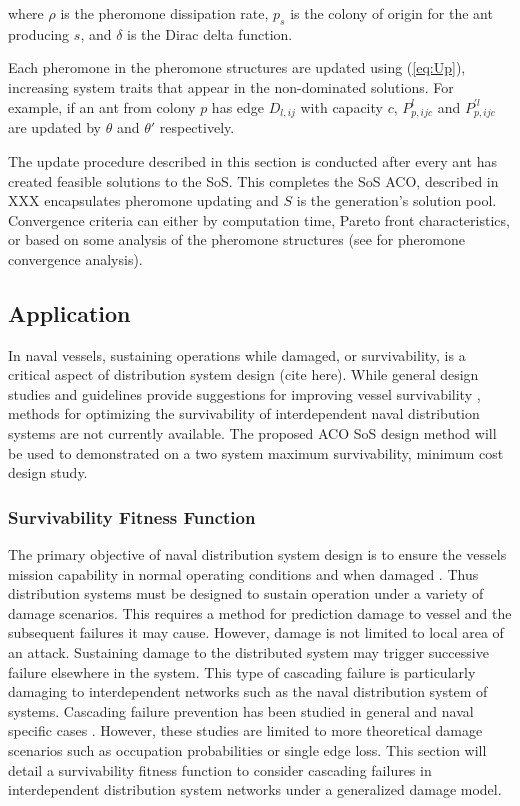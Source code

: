\documentclass[preprint,12pt]{elsarticle}
\begin{document}
\noindent where $\rho$ is the pheromone dissipation rate, $p_s$ is the colony of origin for the ant producing $s$, and $\delta$ is the Dirac delta function. 

Each pheromone in the pheromone structures are updated using (\ref{eq:Up}), increasing system traits that appear in the non-dominated solutions. For example, if an ant from colony $p$ has edge $D_{l,ij}$ with capacity $c$, $P^l_{p,ijc}$ and $P^{'l}_{p,ijc}$ are updated by $\theta$ and $\theta'$ respectively. 

The update procedure described in this section is conducted after every ant has created feasible solutions to the SoS. This completes the SoS ACO, described in XXX encapsulates pheromone updating and $S$ is the generation's solution pool. Convergence criteria can either by computation time, Pareto front characteristics, or based on some analysis of the pheromone structures (see \cite{Stutzle2000} for pheromone convergence analysis). 


\subsection{Application}

In naval vessels, sustaining operations while damaged, or survivability, is a critical aspect of distribution system design (cite here). While general design studies and guidelines provide suggestions for improving vessel survivability \citep{Doerry2007,Kok2012}, methods for optimizing the survivability of interdependent naval distribution systems are not currently available. The proposed ACO SoS design method will be used to demonstrated on a two system maximum survivability, minimum cost design study.

                                                               

\subsubsection{Survivability Fitness Function} \label{sec:surv}
The primary objective of naval distribution system design is to ensure the vessels mission capability in normal operating conditions and when damaged \cite{Amy2002}. Thus distribution systems must be designed to sustain operation under a variety of damage scenarios. This requires a method for prediction damage to vessel and the subsequent failures it may cause. However, damage is not limited to local area of an attack. Sustaining damage to the distributed system may trigger successive failure elsewhere in the system. This type of cascading failure is particularly damaging to interdependent networks \cite{Gao2011,Schneider2013} such as the naval distribution system of systems. Cascading failure prevention has been studied in general \cite{Schneider2011,Brummitt2012} and naval specific cases \cite{Trapp2015}. However, these studies are limited to more theoretical damage scenarios such as occupation probabilities or single edge loss. This section will detail a survivability fitness function to consider cascading failures in interdependent distribution system networks under a generalized damage model.
\end{document}
